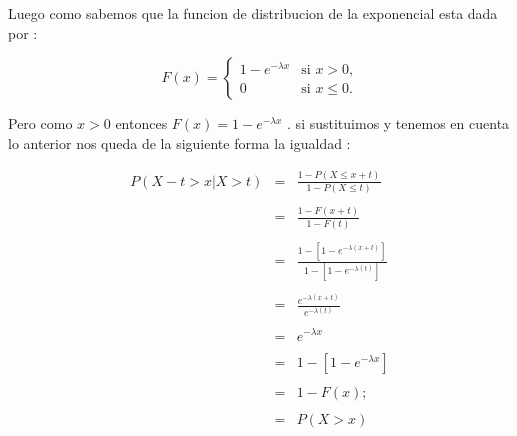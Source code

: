 \documentclass{article}
\begin{document}
\begin{flushleft}
        Luego como sabemos que la funcion de distribucion de la exponencial esta dada por :
        
        \begin{equation*}
            F(x)=\begin{cases}
                1-  e^{-\lambda x }  & \mbox{si $x>0$,}
                \\
                0                    & \mbox{si $x\le 0$.}
                \end{cases}
        \end{equation*}

        Pero como $x > 0  $ entonces $F\left(x\right) = 1 - e^{- \lambda x}$ . si sustituimos y tenemos 
        en cuenta lo anterior nos queda de la siguiente forma la igualdad :

        \begin{equation*}
            \begin{array}{rcl}
                P \left(X-t > x \vert  X > t\right)  & = & \frac{1 - P \left(X \le x + t \right)}{1 - P\left(X \le t \right)}
                \\
                \\
                                                    & = & \frac{1 - F \left( x + t \right)}{1 - F\left(t \right)}
                \\
                \\
                                                    & = & \frac{1 - \left[1 - e^{- \lambda \left(x+t\right)}\right]}{1 - \left[1 - e^{- \lambda \left(t\right)}\right]}
                \\
                \\
                                                    & = & \frac{e^{- \lambda \left(x+t\right)}}{e^{- \lambda\left(t\right)}}
                \\
                \\
                                                    & = & e^{- \lambda x}
                \\
                \\
                                                    & = & 1 - \left[1 - e^{- \lambda x}\right]
                \\
                \\                                   
                                                    & = & 1 - F \left(x\right);
                \\
                \\
                                                    & = & P \left( X > x \right)
            \end{array}        
        \end{equation*}


\end{flushleft}
\end{document}
